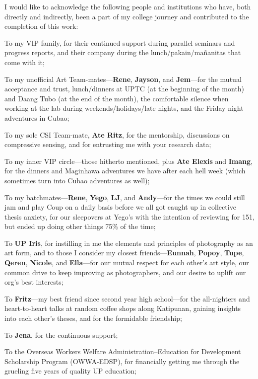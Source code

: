 I would like to acknowledge the following people and institutions who have, both directly and indirectly, been a part of my college journey and contributed to the completion of this work:

To my VIP family, for their continued support during parallel seminars and progress reports, and their company during the lunch/pakain/ma\~{n}anitas that come with it;

To my unofficial Art Team-mates---\textbf{Rene}, \textbf{Jayson}, and \textbf{Jem}---for the mutual acceptance and trust, lunch/dinners at UPTC (at the beginning of the month) and Daang Tubo (at the end of the month), the comfortable silence when working at the lab during weekends/holidays/late nights, and the Friday night adventures in Cubao;

To my sole CSI Team-mate, \textbf{Ate Ritz}, for the mentorship, discussions on compressive sensing, and for entrusting me with your research data;

To my inner VIP circle---those hitherto mentioned, plus \textbf{Ate Elexis} and \textbf{Imang}, for the dinners and Maginhawa adventures we have after each hell week (which sometimes turn into Cubao adventures as well);

To my batchmates---\textbf{Rene}, \textbf{Yego}, \textbf{LJ}, and \textbf{Andy}---for the times we could still jam and play Coup on a daily basis before we all got caught up in collective thesis anxiety, for our sleepovers at Yego's with the intention of reviewing for 151, but ended up doing other things 75\% of the time;

To \textbf{UP Iris}, for instilling in me the elements and principles of photography as an art form, and to those I consider my closest friends---\textbf{Eunnah}, \textbf{Popoy}, \textbf{Tupe}, \textbf{Qeren}, \textbf{Nicole}, and \textbf{Ella}---for our mutual respect for each other's art style, our common drive to keep improving as photographers, and our desire to uplift our org's best interests;

To \textbf{Fritz}---my best friend since second year high school---for the all-nighters and heart-to-heart talks at random coffee shops along Katipunan, gaining insights into each other's theses, and for the formidable friendship;

To \textbf{Jena}, for the continuous support;

To the Overseas Workers Welfare Administration--Education for Development Scholarship Program (OWWA-EDSP), for financially getting me through the grueling five years of quality UP education;

